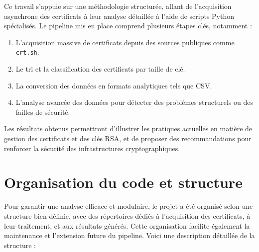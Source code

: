 \documentclass[11pt,a4paper]{article}
\begin{document}
Ce travail s'appuie sur une méthodologie structurée, allant de l'acquisition asynchrone des certificats à leur analyse détaillée à l'aide de scripts Python spécialisés. Le pipeline mis en place comprend plusieurs étapes clés, notamment :
\begin{enumerate}
    \item L'acquisition massive de certificats depuis des sources publiques comme \texttt{crt.sh}.
    \item Le tri et la classification des certificats par taille de clé.
    \item La conversion des données en formats analytiques tels que CSV.
    \item L'analyse avancée des données pour détecter des problèmes structurels ou des failles de sécurité.
\end{enumerate}

Les résultats obtenus permettront d'illustrer les pratiques actuelles en matière de gestion des certificats et des clés RSA, et de proposer des recommandations pour renforcer la sécurité des infrastructures cryptographiques.

\section{Organisation du code et structure}

Pour garantir une analyse efficace et modulaire, le projet a été organisé selon une structure bien définie, avec des répertoires dédiés à l'acquisition des certificats, à leur traitement, et aux résultats générés. Cette organisation facilite également la maintenance et l'extension future du pipeline. Voici une description détaillée de la structure :
\end{document}
